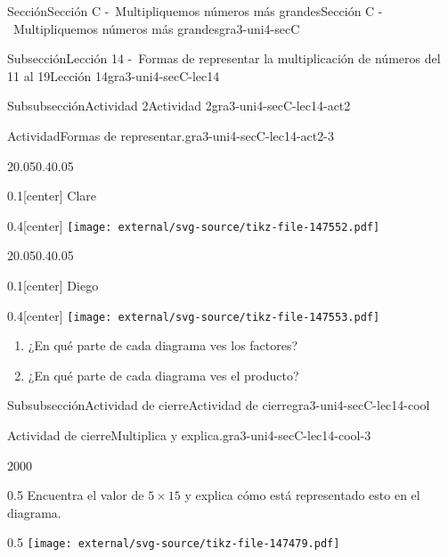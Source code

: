 \documentclass[twoside,14pt,]{extarticle}
\begin{document}
\begin{sectionptx}{Sección}{Sección C -~Multipliquemos números más grandes}{}{Sección C -~Multipliquemos números más grandes}{}{}{gra3-uni4-secC}
\begin{subsectionptx}{Subsección}{Lección 14 -~Formas de representar la multiplicación de números del 11 al 19}{}{Lección 14}{}{}{gra3-uni4-secC-lec14}
\begin{subsubsectionptx}{Subsubsección}{Actividad 2}{}{Actividad 2}{}{}{gra3-uni4-secC-lec14-act2}
\begin{activity}{Actividad}{Formas de representar.}{gra3-uni4-secC-lec14-act2-3}
\begin{sidebyside}{2}{0.05}{0.4}{0.05}%
\begin{sbspanel}{0.1}[center]%
Clare%
\end{sbspanel}%
\begin{sbspanel}{0.4}[center]%
\texttt{[image: external/svg-source/tikz-file-147552.pdf]}
\end{sbspanel}%
\end{sidebyside}%
\begin{sidebyside}{2}{0.05}{0.4}{0.05}%
\begin{sbspanel}{0.1}[center]%
Diego%
\end{sbspanel}%
\begin{sbspanel}{0.4}[center]%
\texttt{[image: external/svg-source/tikz-file-147553.pdf]}
\end{sbspanel}%
\end{sidebyside}%
%
\begin{enumerate}
\item{}¿En qué parte de cada diagrama ves los factores?%
\item{}¿En qué parte de cada diagrama ves el producto?%
\end{enumerate}
\end{activity}%
\end{subsubsectionptx}
%
%
\typeout{************************************************}
\typeout{************************************************}
%
\begin{subsubsectionptx}{Subsubsección}{Actividad de cierre}{}{Actividad de cierre}{}{}{gra3-uni4-secC-lec14-cool}
\begin{project}{Actividad de cierre}{Multiplica y explica.}{gra3-uni4-secC-lec14-cool-3}%
\begin{sidebyside}{2}{0}{0}{0}%
\begin{sbspanel}{0.5}%
Encuentra el valor de \(5\times 15\) y explica cómo está representado esto en el diagrama.%
\end{sbspanel}%
\begin{sbspanel}{0.5}%
\texttt{[image: external/svg-source/tikz-file-147479.pdf]}
\end{sbspanel}%
\end{sidebyside}%
\end{project}%
\end{subsubsectionptx}
\end{subsectionptx}

\end{sectionptx}
\end{document}
